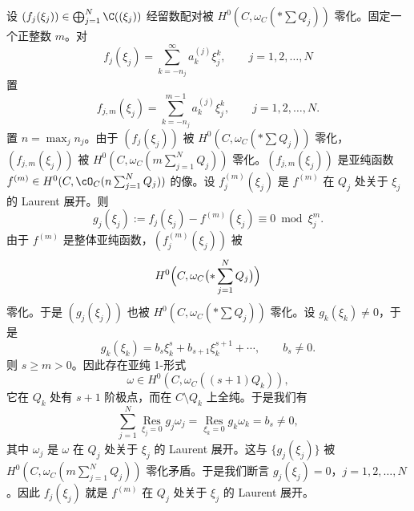 设 $(f_j(\xi_j))\in\bigoplus_{j=1}^N\C((\xi_j))$ 经留数配对被 $H^0(C,\omega_C(\ast\sum Q_j))$ 零化。固定一个正整数 $m$。对
\[
f_j(\xi_j)=\sum_{k=-n_j}^{\infty}a_k^{(j)}\xi_j^k,\qquad j=1,2,\dots,N
\]
置
\[
f_{j,m}(\xi_j)=\sum_{k=-n_j}^{m-1}a_k^{(j)}\xi_j^k,\qquad j=1,2,\dots,N .
\]
置 $n=\max_j n_j$。由于 $(f_j(\xi_j))$ 被 $H^0(C,\omega_C(\ast\sum Q_j))$ 零化，$(f_{j,m}(\xi_j))$ 被 $H^0(C,\omega_C(m\sum_{j=1}^N Q_j))$ 零化。$(f_{j,m}(\xi_j))$ 是亚纯函数 $f^{(m)}\in H^0(C,\cO_C(n\sum_{j=1}^N Q_j))$ 的像。设 $f_j^{(m)}(\xi_j)$ 是 $f^{(m)}$ 在 $Q_j$ 处关于 $\xi_j$ 的 Laurent 展开。则
\[
g_j(\xi_j):=f_j(\xi_j)-f^{(m)}(\xi_j)\equiv 0\bmod \xi_j^m .
\]
由于 $f^{(m)}$ 是整体亚纯函数，$(f_j^{(m)}(\xi_j))$ 被
\[
H^0\Bigl(C,\omega_C\bigl(\ast\sum_{j=1}^N Q_j\bigr)\Bigr)
\]
零化。于是 $(g_j(\xi_j))$ 也被 $H^0(C,\omega_C(\ast\sum Q_j))$ 零化。设 $g_k(\xi_k)\ne 0$，于是
\[
g_k(\xi_k)=b_s\xi_k^s+b_{s+1}\xi_k^{s+1}+\cdots,\qquad b_s\ne 0 .
\]
则 $s\ge m>0$。因此存在亚纯 1-形式
\[
\omega\in H^0(C,\omega_C((s+1)Q_k)),
\]
它在 $Q_k$ 处有 $s+1$ 阶极点，而在 $C\setminus Q_k$ 上全纯。于是我们有
\[
\sum_{j=1}^N\operatorname*{Res}_{\xi_j=0}g_j\omega_j=\operatorname*{Res}_{\xi_k=0}g_k\omega_k=b_s\ne 0,
\]
其中 $\omega_j$ 是 $\omega$ 在 $Q_j$ 处关于 $\xi_j$ 的 Laurent 展开。这与 $\{g_j(\xi_j)\}$ 被 $H^0(C,\omega_C(m\sum_{j=1}^N Q_j))$ 零化矛盾。于是我们断言 $g_j(\xi_j)=0$，$j=1,2,\dots,N$。因此 $f_j(\xi_j)$ 就是 $f^{(m)}$ 在 $Q_j$ 处关于 $\xi_j$ 的 Laurent 展开。


